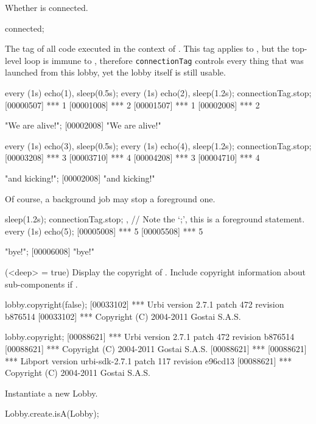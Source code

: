 \begin{urbiscriptapi}
\item[connected]
  Whether \this is connected.
\begin{urbiassert}
connected;
\end{urbiassert}

\item[connectionTag] The tag of all code executed in the context of \this.
  This tag applies to \this, but the top-level loop is immune to
  , therefore \lstinline|connectionTag| controls every
  thing that was launched from this lobby, yet the lobby itself is still
  usable.
\begin{urbiscript}
every (1s) echo(1), sleep(0.5s); every (1s) echo(2),
sleep(1.2s);
connectionTag.stop;
[00000507] *** 1
[00001008] *** 2
[00001507] *** 1
[00002008] *** 2

"We are alive!";
[00002008] "We are alive!"

every (1s) echo(3), sleep(0.5s); every (1s) echo(4),
sleep(1.2s);
connectionTag.stop;
[00003208] *** 3
[00003710] *** 4
[00004208] *** 3
[00004710] *** 4

"and kicking!";
[00002008] "and kicking!"
\end{urbiscript}

  Of course, a background job may stop a foreground one.
\begin{urbiscript}
{ sleep(1.2s); connectionTag.stop; },
// Note the `;', this is a foreground statement.
every (1s) echo(5);
[00005008] *** 5
[00005508] *** 5

"bye!";
[00006008] "bye!"
\end{urbiscript}

\item[copyright](<deep> = true)%
  Display the copyright of \usdk.  Include copyright information
  about sub-components if .
\begin{urbiscript}
lobby.copyright(false);
[00033102] *** Urbi version 2.7.1 patch 472 revision b876514
[00033102] *** Copyright (C) 2004-2011 Gostai S.A.S.

lobby.copyright;
[00088621] *** Urbi version 2.7.1 patch 472 revision b876514
[00088621] *** Copyright (C) 2004-2011 Gostai S.A.S.
[00088621] ***
[00088621] *** Libport version urbi-sdk-2.7.1 patch 117 revision e96cd13
[00088621] *** Copyright (C) 2004-2011 Gostai S.A.S.
\end{urbiscript}

\item[create]
  Instantiate a new Lobby.
\begin{urbiassert}
Lobby.create.isA(Lobby);
\end{urbiassert}


\end{urbiscriptapi}
